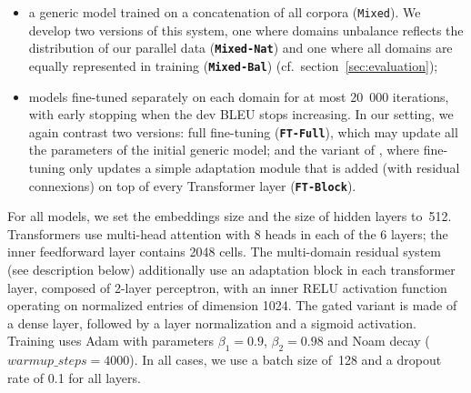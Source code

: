 \documentclass[11pt]{article}
\newcommand{\fyDone}[1]{\done[FY]\Todo[FY:]{\textcolor{orange}{#1}}}
\newcommand{\jcTodo}[1]{\Todo[JC:]{\textcolor{blue}{#1}}}
\newcommand{\jcDone}[1]{\done[JC]\Todo[JC:]{\textcolor{blue}{#1}}}
\newcommand{\system}[1]{\texttt{\textbf{#1}}}
\begin{document}
\begin{itemize}
\item a generic model trained on a concatenation of all corpora (\texttt{Mixed}). We develop two versions of this system, one where domains unbalance reflects the distribution of our parallel data (\system{Mixed-Nat}) and one where all domains are equally represented in training (\system{Mixed-Bal}) (cf.\ section~\ref{sec:evaluation}); \jcTodo{All systems cand be learned following both Bal and Nat. does Nat corresponds to wAVG in test? is wAVG defined somewhere?}
\item models fine-tuned \cite{Luong15stanford,Freitag16fast} \jcDone{i would use Luong and Manning 2015} separately on each domain for at most 20~000 iterations, with early stopping when the dev BLEU stops increasing. In our setting, we again contrast two versions: full fine-tuning (\system{FT-Full}), which may update all the parameters of the initial generic model; and the variant of \cite{Bapna19simple}, where fine-tuning only updates a simple adaptation module that is added (with residual connexions) on top of every Transformer layer (\system{FT-Block}).
\end{itemize}

For all models, we set the embeddings size and the size of hidden layers to~512. Transformers use multi-head attention with 8 heads in each of the 6 layers; the inner feedforward layer contains 2048 cells. The multi-domain residual system (see description below) additionally use an adaptation block in each transformer layer, composed of 2-layer perceptron, with an inner RELU activation function operating on normalized entries of dimension 1024. The gated variant is made of a dense layer, followed by a layer normalization and a sigmoid activation.
Training uses Adam with parameters $\beta_1=0.9$, $\beta_2= 0.98$ and Noam decay ($warmup\_steps=4000$). In all cases, we use a batch size of~128 and a dropout rate of 0.1 for all layers. %
\fyDone{Describe the block adaptation layer - voir slides} 
\end{document}
